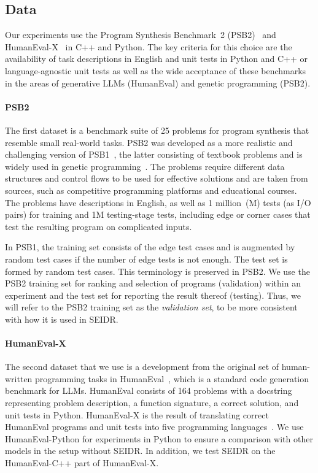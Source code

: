 \newpage\subsection{Data}
\label{sec:seidr-data}

Our experiments use the Program Synthesis Benchmark~2 (PSB2)~\cite{helmuth2022:applying} and HumanEval-X~\cite{zheng2023:codegeex} in C++ and Python. 
The key criteria for this choice are the availability of task descriptions in English and unit tests in Python and C++ or language-agnostic unit tests as well as the wide acceptance of these benchmarks in the areas of generative LLMs (HumanEval) and genetic programming (PSB2). 

\paragraph{PSB2}
The first dataset is a benchmark suite of 25 problems for program synthesis that resemble small real-world tasks. PSB2 was developed as a more realistic and challenging version of PSB1~\cite{helmuth2015:general}, the latter consisting of textbook problems and is widely used in genetic programming~\cite{sobania2022:choose}. 
The problems require different data structures and control flows to be used for effective solutions and are taken from sources, such as competitive programming platforms and educational courses. 
The problems have descriptions in English, as well as 1 million~(M) tests (as I/O pairs) for training and 1M testing-stage tests, including edge or corner cases that test the resulting program on complicated inputs. 

In PSB1, the training set consists of the edge test cases and is augmented by random test cases if the number of edge tests is not enough. The test set is formed by random test cases. 
This terminology is preserved in PSB2.
We use the PSB2 training set for ranking and selection of programs (validation) within an experiment and the test set for reporting the result thereof (testing).
Thus, we will refer to the PSB2 training set as the \emph{validation set}, to be more consistent with how it is used in SEIDR.

\paragraph{HumanEval-X}
The second dataset that we use is a development from the original set of human-written programming tasks in HumanEval~\cite{chenEvaluatingLargeLanguage2021}, which is a standard code generation benchmark for LLMs.
HumanEval consists of 164 problems with a docstring representing problem description, a function signature, a correct solution, and unit tests in Python. 
HumanEval-X is the result of translating correct HumanEval programs and unit tests into five programming languages~\cite{zheng2023:codegeex}. 
We use HumanEval-Python for experiments in Python to ensure a comparison with other models in the setup without SEIDR. 
In addition, we test SEIDR on the HumanEval-C++ part of HumanEval-X. %

